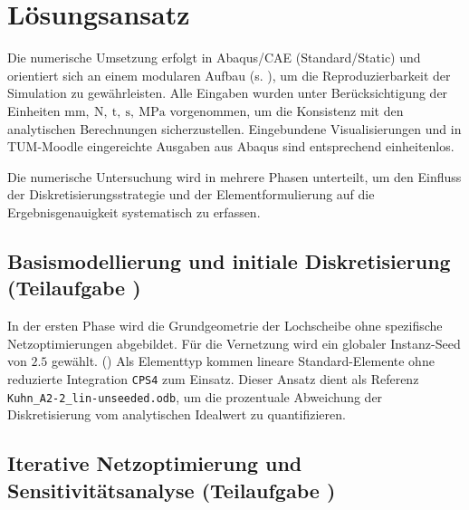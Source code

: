 \chapter{Lösungsansatz}
\label{sec:Lösungsansatz}

Die numerische Umsetzung erfolgt in Abaqus/CAE (Standard/Static) und orientiert sich an einem modularen Aufbau (s. ), um die Reproduzierbarkeit der Simulation zu gewährleisten. Alle Eingaben wurden unter Berücksichtigung der Einheiten $\mathrm{mm,\ N,\ t,\ s,\ MPa}$ vorgenommen, um die Konsistenz mit den analytischen Berechnungen sicherzustellen. Eingebundene Visualisierungen und in TUM-Moodle eingereichte Ausgaben aus Abaqus sind entsprechend einheitenlos.

Die numerische Untersuchung wird in mehrere Phasen unterteilt, um den Einfluss der Diskretisierungsstrategie und der Elementformulierung auf die Ergebnisgenauigkeit systematisch zu erfassen.

\section{Basismodellierung und initiale Diskretisierung (Teilaufgabe )}
\label{sec:Basismodellierung und initiale Diskretisierung}

In der ersten Phase wird die Grundgeometrie der Lochscheibe ohne spezifische Netzoptimierungen abgebildet. Für die Vernetzung wird ein globaler Instanz-Seed von ${2.5}$ gewählt. () Als Elementtyp kommen lineare Standard-Elemente ohne reduzierte Integration \texttt{CPS4} zum Einsatz. Dieser Ansatz dient als Referenz \texttt{Kuhn\_A2-2\_lin-unseeded.odb}, um die prozentuale Abweichung der Diskretisierung vom analytischen Idealwert zu quantifizieren.

\section{Iterative Netzoptimierung und Sensitivitätsanalyse (Teilaufgabe )}
\label{sec:Iterative Netzoptimierung und Sensitivitätsanalyse}

